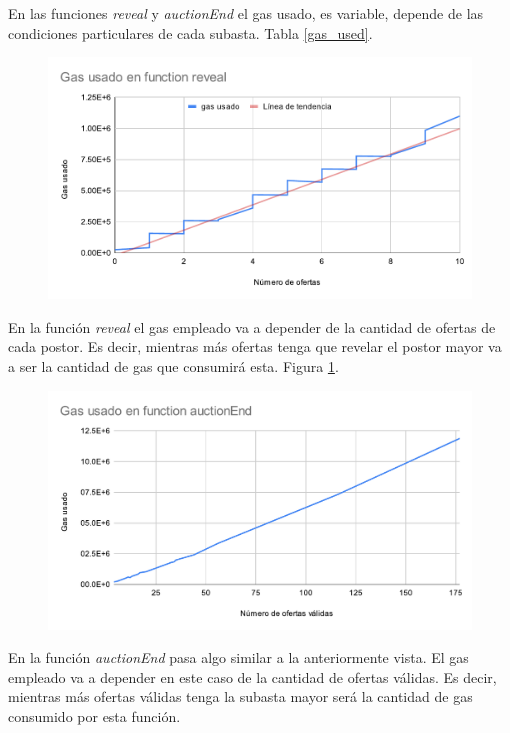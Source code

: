   
        En las funciones \textit{reveal} y \textit{auctionEnd} el gas usado, es variable, depende de las
        condiciones particulares de cada subasta. Tabla \ref{gas_used}.
  
  
        \begin{figure}
          \centering
          \includegraphics[scale=0.9]{Graphics/gas_reveal.pdf}
          \caption{}
          \label{gas_reveal}
        \end{figure} 
    
        En la función \textit{reveal} el gas empleado va a depender de la cantidad de ofertas de cada postor.
        Es decir, mientras más ofertas tenga que revelar el postor mayor va a ser la cantidad de gas que
        consumirá esta. Figura \ref{gas_reveal}.
  
  
        \begin{figure}
          \centering
          \includegraphics[scale=0.9]{Graphics/gas_auctionEnd.pdf}
          \caption{}
          \label{gas_auctionEnd}
        \end{figure} 
    
        En la función \textit{auctionEnd} pasa algo similar a la anteriormente vista. El gas empleado va a 
        depender en este caso de la cantidad de ofertas válidas. Es decir, mientras más ofertas válidas tenga 
        la subasta mayor será la cantidad de gas consumido por esta función.
  
